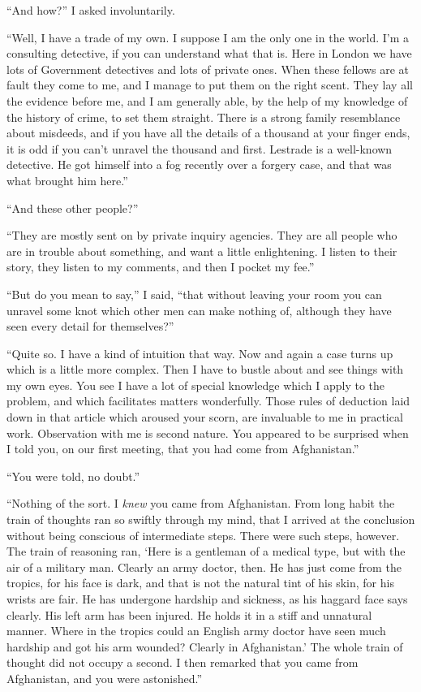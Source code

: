 \documentclass[12pt,english,oneside]{book}
\begin{document}
{}``And how?'' I asked involuntarily.

{}``Well, I have a trade of my own. I suppose I am the only one in
the world. I'm a consulting detective, if you can understand what
that is. Here in London we have lots of Government detectives and
lots of private ones. When these fellows are at fault they come to
me, and I manage to put them on the right scent. They lay all the
evidence before me, and I am generally able, by the help of my knowledge
of the history of crime, to set them straight. There is a strong family
resemblance about misdeeds, and if you have all the details of a thousand
at your finger ends, it is odd if you can't unravel the thousand and
first. Lestrade is a well-known detective. He got himself into a fog
recently over a forgery case, and that was what brought him here.''

{}``And these other people?''

{}``They are mostly sent on by private inquiry agencies. They are
all people who are in trouble about something, and want a little enlightening.
I listen to their story, they listen to my comments, and then I pocket
my fee.''

{}``But do you mean to say,'' I said, {}``that without leaving
your room you can unravel some knot which other men can make nothing
of, although they have seen every detail for themselves?''

{}``Quite so. I have a kind of intuition that way. Now and again
a case turns up which is a little more complex. Then I have to bustle
about and see things with my own eyes. You see I have a lot of special
knowledge which I apply to the problem, and which facilitates matters
wonderfully. Those rules of deduction laid down in that article which
aroused your scorn, are invaluable to me in practical work. Observation
with me is second nature. You appeared to be surprised when I told
you, on our first meeting, that you had come from Afghanistan.''

{}``You were told, no doubt.''

{}``Nothing of the sort. I \textit{knew} you came from Afghanistan.
From long habit the train of thoughts ran so swiftly through my mind,
that I arrived at the conclusion without being conscious of intermediate
steps. There were such steps, however. The train of reasoning ran,
`Here is a gentleman of a medical type, but with the air of a military
man. Clearly an army doctor, then. He has just come from the tropics,
for his face is dark, and that is not the natural tint of his skin,
for his wrists are fair. He has undergone hardship and sickness, as
his haggard face says clearly. His left arm has been injured. He holds
it in a stiff and unnatural manner. Where in the tropics could an
English army doctor have seen much hardship and got his arm wounded?
Clearly in Afghanistan.' The whole train of thought did not occupy
a second. I then remarked that you came from Afghanistan, and you
were astonished.''
\end{document}

